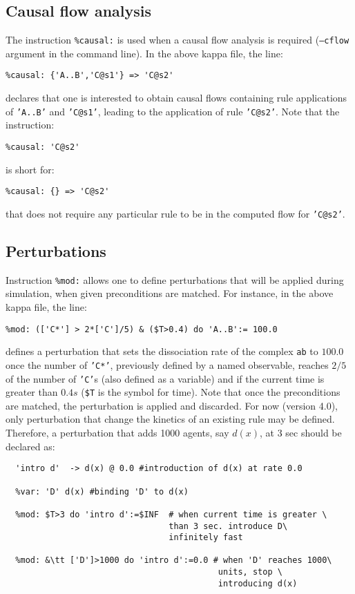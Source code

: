 \documentclass{article}
\begin{document}
\subsection{Causal flow analysis}
The instruction \texttt{\%causal:} is used when a causal flow analysis is required (\texttt{--cflow} argument in the command line). In the above kappa file, the line:
\begin{verbatim}
%causal: {'A..B','C@s1'} => 'C@s2' 
\end{verbatim}
declares that one is interested to obtain causal flows containing rule applications of \texttt{'A..B'} and \texttt{'C@s1'}, leading to the application of rule \texttt{'C@s2'}. Note that the instruction:%
\begin{verbatim}
%causal: 'C@s2' 
\end{verbatim}
is short for:
\begin{verbatim}
%causal: {} => 'C@s2' 
\end{verbatim}
that does not require any particular rule to be in the computed flow for \texttt{'C@s2'}.

\subsection{Perturbations}
Instruction \texttt{\%mod:} allows one to define perturbations that will be applied during simulation, when given preconditions are matched. For instance, in the above kappa file, the line:
\begin{verbatim}
%mod: (['C*'] > 2*['C']/5) & ($T>0.4) do 'A..B':= 100.0 
\end{verbatim}
defines a perturbation that sets the dissociation rate of the complex \texttt{ab} to $100.0$ once the number of \texttt{'C*'}, previously defined by a named observable, reaches $2/5$ of the number of \texttt{'C'}s (also defined as a variable) and if the current time is greater than $0.4s$ (\texttt{\$T} is the symbol for time). Note that once the preconditions are matched, the perturbation is applied and discarded. For now (version 4.0), only perturbation that change the kinetics of an existing rule may be defined. Therefore, a perturbation that adds 1000 agents, say $d(x)$, at 3 sec should be declared as:
\begin{verbatim}
  'intro d'  -> d(x) @ 0.0 #introduction of d(x) at rate 0.0
  
  %var: 'D' d(x) #binding 'D' to d(x) 

  %mod: $T>3 do 'intro d':=$INF  # when current time is greater \
                                 than 3 sec. introduce D\
                                 infinitely fast

  %mod: &\tt ['D']>1000 do 'intro d':=0.0 # when 'D' reaches 1000\
                                           units, stop \
                                           introducing d(x)

\end{verbatim}
\end{document}
